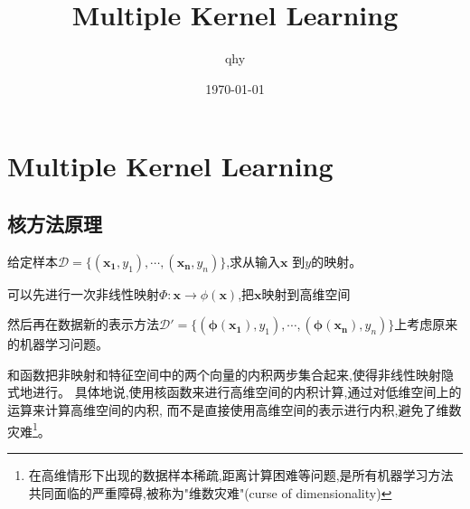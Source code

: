 \documentclass[UTF8,a4paper]{ctexart}
\author{qhy}
\date{\today}
\title{Multiple Kernel Learning}
\begin{document}
    \maketitle
    \tableofcontents
    \newpage
    \section{Multiple Kernel Learning}
        \subsection{核方法原理}
        给定样本$\mathcal{D} = \{(\bm{x_1} , y_1),\cdots,(\bm{x_n} , y_n)\}$,求从输入$\bm x$ 到$y$的映射。

        可以先进行一次非线性映射$\Phi:\bm x\to\phi(\bm x)$,把$\bm x$映射到高维空间

        然后再在数据新的表示方法$\mathcal{D'} = \{(\bm{\phi(x_1)} , y_1),\cdots,(\bm{\phi(x_n)} , y_n)\}$上考虑原来的机器学习问题。

        和函数把非映射和特征空间中的两个向量的内积两步集合起来,使得非线性映射隐式地进行。
        具体地说,使用核函数来进行高维空间的内积计算,通过对低维空间上的运算来计算高维空间的内积,
        而不是直接使用高维空间的表示进行内积,避免了维数灾难\footnote{在高维情形下出现的数据样本稀疏,距离计算困难等问题,是所有机器学习方法共同面临的严重障碍,被称为"维数灾难"(curse of dimensionality)}。
\end{document}

